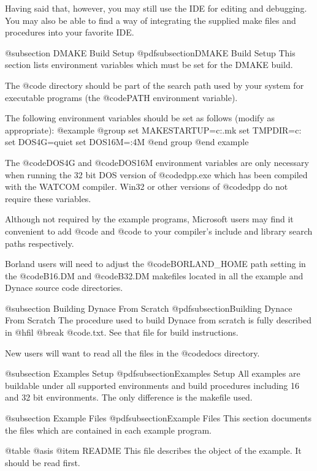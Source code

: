 Having said that, however, you may still use the IDE for editing and
debugging.  You may also be able to find a way of integrating the
supplied make files and procedures into your favorite IDE.

@subsection DMAKE Build Setup
@pdfsubsection{DMAKE Build Setup}
This section lists environment variables which must be set for the
DMAKE build.

The @code{\DYANCE\BIN} directory should be part of the search path used
by your system for executable programs (the @code{PATH} environment
variable).

The following environment variables should be set as follows (modify as
appropriate):
@example
@group
set MAKESTARTUP=c:\dynace\utils\startup.mk
set TMPDIR=c:\tmp
set DOS4G=quiet
set DOS16M=:4M
@end group
@end example

The @code{DOS4G} and @code{DOS16M} environment variables are only necessary
when running the 32 bit DOS version of @code{dpp.exe} which has been
compiled with the WATCOM compiler.  Win32 or other versions of @code{dpp}
do not require these variables.

Although not required by the example programs, Microsoft users may find
it convenient to add @code{\DYNACE\INCLUDE} and @code{\DYNACE\LIB} to
your compiler's include and library search paths respectively.

Borland users will need to adjust the @code{BORLAND_HOME} path setting
in the @code{B16.DM} and @code{B32.DM} makefiles located in all the
example and Dynace source code directories.


@subsection Building Dynace From Scratch
@pdfsubsection{Building Dynace From Scratch}
The procedure used to build Dynace from scratch is fully described
in @hfil @break @code{\DYNACE\DOCS\BUILD.txt}.  See that file for build instructions.

New users will want to read all the files in the @code{docs} directory.


@subsection Examples Setup
@pdfsubsection{Examples Setup}
All examples are buildable under all supported environments and build
procedures including 16 and 32 bit environments.  The only difference is
the makefile used.



@subsection Example Files
@pdfsubsection{Example Files}
This section documents the files which are contained in each example
program.

@table @asis
@item README
This file describes the object of the example.  It should be read
first.

